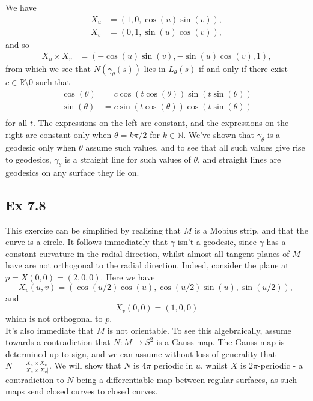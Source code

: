 \documentclass{article}
\theoremstyle{definition}
\newcommand{\R}{\mathbb{R}}
\newcommand{\N}{\mathbb{N}}
\begin{document}
We have 
\begin{align*}
	X_u &= (1, 0, \cos(u)\sin(v)), \\
	X_v &= (0, 1, \sin(u)\cos(v)), 
\end{align*} 
and so
\begin{align*}
	X_u \times X_v
	&=
	(-\cos(u)\sin(v), -\sin(u)\cos(v), 1),
\end{align*}
from which we see that $N(\gamma_\theta(s))$ lies in $L_\theta(s)$ if and only if 
there exist $c \in \R \setminus 0$ such that
\begin{align*}
	\cos(\theta)
	&=
	c \cos(t\cos(\theta))\sin(t\sin(\theta)) \\
	\sin(\theta)
	&=
	c \sin(t\cos(\theta))\cos(t\sin(\theta)) \\
\end{align*} 
for all $t$. The expressions on the left are constant, and the expressions on
the right are constant only when $\theta = k\pi/2$ for $k \in \N$. We've shown
that $\gamma_\theta$ is a geodesic only when $\theta$ assume such values, and
to see that all such values give rise to geodesics, $\gamma_\theta$ is a
straight line for such values of $\theta$, and straight lines are geodesics on
any surface they lie on.

\subsection*{Ex 7.8}

This exercise can be simplified by realising that $M$ is a Mobius strip, and
that the curve is a circle. It follows immediately that $\gamma$ isn't a
geodesic, since $\gamma$ has a constant curvature in the radial direction,
whilst almost all tangent planes of $M$ have are not orthogonal to the radial
direction. Indeed, consider the plane at $p = X(0, 0) = (2, 0, 0)$. Here we
have 
\[
	X_v(u, v) = (\cos(u/2)\cos(u), \cos(u/2)\sin(u), \sin(u/2)), \,
\] 
and
\[
	X_v(0,0)
	=
	(1, 0, 0)
\] 
which is not orthogonal to $p$. \\

It's also immediate that $M$ is not orientable. To see this algebraically,
assume towards a contradiction that $N : M \to S^2$ is a Gauss map. The Gauss
map is determined up to sign, and we can assume without loss of generality that
$N = \frac{X_u \times X_v}{|X_u \times X_v|}$. We will show that $N$ is $4\pi$
periodic in $u$, whilst $X$ is $2\pi$-periodic - a contradiction to $N$ being a
differentiable map between regular surfaces, as such maps send closed curves to
closed curves. \\
\end{document}
